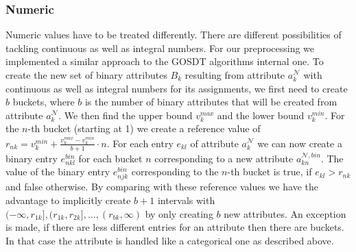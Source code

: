 \documentclass[a4paper,preprint]{sig-alternate-xt}
\begin{document}
\subsubsection{Numeric}
Numeric values have to be treated differently.
There are different possibilities of tackling continuous as well as integral numbers.
For our preprocessing we implemented a similar approach to the GOSDT algorithms internal one.
To create the new set of binary attributes $B_k$ resulting from attribute $a^\mathcal{N}_k$ with continuous as well as integral numbers for its assignments, we first need to create $b$ buckets, where $b$ is the number of binary attributes that will be created from attribute $a^\mathcal{N}_k$.
We then find the upper bound $v^{max}_k$ and the lower bound $v^{min}_k$. For the $n$-th bucket (starting at 1) we create a reference value of $r_{n k} = v^{min}_k + \frac{v^{max}_k-v^{min}_k}{b+1} \cdot n$.
For each entry $e_{kl}$ of attribute $a^\mathcal{N}_k$ we can now create a binary entry $e^{bin}_{n k l}$ for each bucket $n$ corresponding to a new attribute $a^{\mathcal{N}, bin}_{kn}$.
The value of the binary entry $e^{bin}_{n j k}$ corresponding to the $n$-th bucket is true, if $e_{kl}>r_{n k}$ and false otherwise.
By comparing with these reference values we have the advantage to implicitly create $b+1$ intervals with $(-\infty, r_{1 k}], (r_{1 k}, r_{2 k}], \dots, (r_{b k}, \infty)$ by only creating $b$ new attributes.
An exception is made, if there are less different entries for an attribute then there are buckets.
In that case the attribute is handled like a categorical one as described above.
\end{document}
